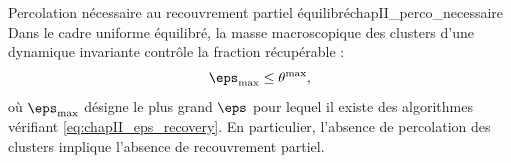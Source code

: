 \begin{Corollaire}{Percolation nécessaire au recouvrement partiel équilibré}{chapII_perco_necessaire}
Dans le cadre uniforme équilibré, la masse macroscopique des clusters d'une dynamique invariante contrôle la fraction récupérable :
\begin{equation}
    \eps_{\max}\le \theta^{\max},
    \label{eq:chapII_epsmax_theta}
\end{equation}
où $\eps_{\max}$ désigne le plus grand $\eps$ pour lequel il existe des algorithmes vérifiant \eqref{eq:chapII_eps_recovery}. En particulier, l'absence de percolation des clusters implique l'absence de recouvrement partiel.
\end{Corollaire}




